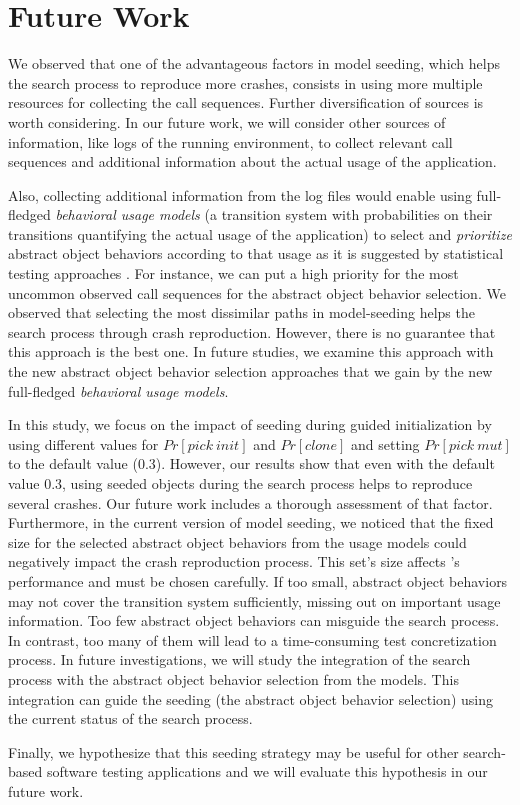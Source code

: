 

\section{Future Work}
\label{sec:model_seeding:future}

We observed that one of the advantageous factors in model seeding, which helps the search process to reproduce more crashes, consists in using more multiple resources for collecting the call sequences. Further diversification of sources is worth considering. In our future work, we will consider other sources of information, like logs of the running environment, to collect relevant call sequences and additional information about the actual usage of the application.

Also, collecting additional information from the log files would enable using full-fledged \emph{behavioral usage models} (\ie a transition system with probabilities on their transitions quantifying the actual usage of the application) to select and \emph{prioritize} abstract object behaviors according to that usage as it is suggested by statistical testing approaches \cite{Devroey2017b}.
For instance, we can put a high priority for the most uncommon observed call sequences for the abstract object behavior selection. We observed that selecting the most dissimilar paths in model-seeding helps the search process through crash reproduction. However, there is no guarantee that this approach is the best one. In future studies, we examine this approach with the new abstract object behavior selection approaches that we gain by the new full-fledged \emph{behavioral usage models}.

In this study, we focus on the impact of seeding during guided initialization by using different values for  $Pr[pick\ init]$ and $Pr[clone]$ and setting $Pr[pick\ mut]$ to the default value (0.3). However, our results show that even with the default value 0.3, using seeded objects during the search process helps to reproduce several crashes. Our future work includes a thorough assessment of that factor.
%
Furthermore, in the current version of model seeding, we noticed that the fixed size for the selected abstract object behaviors from the usage models could negatively impact the crash reproduction process. 
This set's size affects \botsing's performance and must be chosen carefully.  If too small, abstract object behaviors may not cover the transition system sufficiently, missing out on important usage information.  Too few abstract object behaviors can misguide the search process. In contrast, too many of them will lead to a time-consuming test concretization process.
In future investigations, we will study the integration of the search process with the abstract object behavior selection from the models. This integration can guide the seeding (\eg the abstract object behavior selection) using the current status of the search process.

Finally, we hypothesize that this seeding strategy may be useful for other search-based software testing applications and we will evaluate this hypothesis in our future work.
